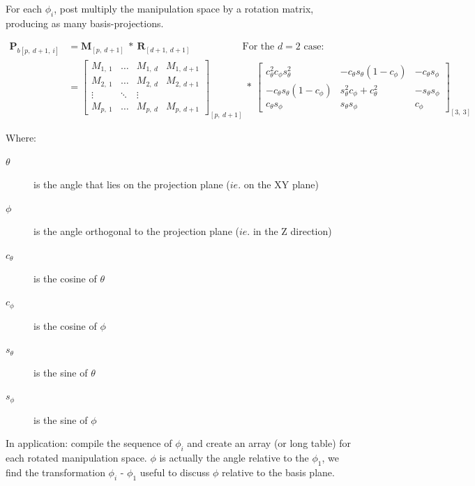\documentclass{monashthesis}
\begin{document}
For each \(\phi_i\), post multiply the manipulation space by a rotation matrix, producing as many basis-projections.

\begin{align*}
  \textbf{P}_{b[p,~d+1,~i]}
  &= \textbf{M}_{[p,~d+1]} ~*~ \textbf{R}_{[d+1,~d+1]} 
    ~~~~~~~~~~~~~~~~~~~~~~~~\text{For the $d=2$ case:} \\
  &= \begin{bmatrix}
    M_{1,~1} & \dots & M_{1,~d} & M_{1,~d+1} \\
    M_{2,~1} & \dots & M_{2,~d} & M_{2,~d+1} \\
    \vdots   & \ddots& \vdots   \\
    M_{p,~1} & \dots & M_{p,~d} & M_{p,~d+1}
  \end{bmatrix}_{[p,~d+1]}
    ~*~
  \begin{bmatrix}
    c_\theta^2 c_\phi s_\theta^2 &
    -c_\theta s_\theta (1 - c_\phi) &
    -c_\theta s_\phi \\
    -c_\theta s_\theta (1 - c_\phi) &
    s_\theta^2 c_\phi + c_\theta^2 &
    -s_\theta s_\phi \\
    c_\theta s_\phi &
    s_\theta s_\phi &
    c_\phi
  \end{bmatrix}_{[3,~3]}
\end{align*}

Where:

\begin{description}
  \item[$\theta$] is the angle that lies on the projection plane ($ie.$ on the XY plane)
  \item[$\phi$] is the angle orthogonal to the projection plane ($ie.$ in the Z direction)
  \item[$c_\theta$] is the cosine of $\theta$
  \item[$c_\phi$]   is the cosine of $\phi$
  \item[$s_\theta$] is the sine of   $\theta$
  \item[$s_\phi$]   is the sine of   $\phi$
\end{description}

In application: compile the sequence of \(\phi_i\) and create an array (or long table) for each rotated manipulation space. \(\phi\) is actually the angle relative to the \(\phi_1\), we find the transformation \(\phi_i\) - \(\phi_1\) useful to discuss \(\phi\) relative to the basis plane.

\begin{Shaded}
\begin{Highlighting}[]
 
\StringTok{ }\OperatorTok{+}\StringTok{ }
\StringTok{ }\NormalTok{(manip_space, theta, phi)[, }\OperatorTok{:}\NormalTok{]}
\NormalTok{\}}
\end{Highlighting}
\end{Shaded}
\end{document}
